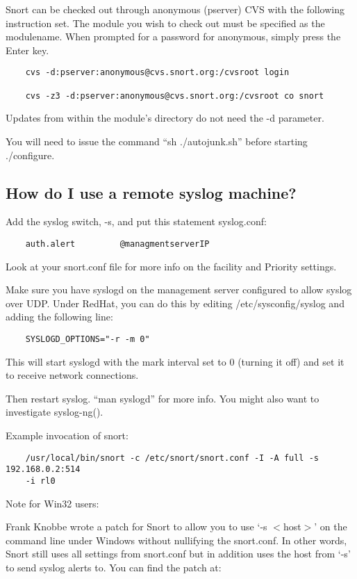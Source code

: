 \documentclass{article}
\begin{document}
Snort can be checked out through anonymous (pserver) CVS with the
following instruction set. The module you wish to check out must be
specified as the modulename. When prompted for a password for anonymous,
simply press the Enter key.
\begin{verbatim}
    cvs -d:pserver:anonymous@cvs.snort.org:/cvsroot login

    cvs -z3 -d:pserver:anonymous@cvs.snort.org:/cvsroot co snort
\end{verbatim}
Updates from within the module's directory do not need the -d parameter. 

You will need to issue the command ``sh ./autojunk.sh'' before starting
./configure.

\subsection{How do I use a remote syslog machine?}

Add the syslog switch, -s, and put this statement syslog.conf:
\begin{verbatim}
    auth.alert         @managmentserverIP
\end{verbatim}

Look at your snort.conf file for more info on the facility and Priority
settings.

Make sure you have syslogd on the management server configured to allow syslog over
UDP. Under RedHat, you can do this by editing /etc/sysconfig/syslog and adding
the following line:
\begin{verbatim}
    SYSLOGD_OPTIONS="-r -m 0"
\end{verbatim}
This will start syslogd with the mark interval set to 0 (turning it off) and
set it to receive network connections.

Then restart syslog. ``man syslogd'' for more info. You might also want to
investigate syslog-ng\linebreak ().

Example invocation of snort:
\begin{verbatim}
    /usr/local/bin/snort -c /etc/snort/snort.conf -I -A full -s 192.168.0.2:514
    -i rl0
\end{verbatim}
Note for Win32 users:

Frank Knobbe wrote a patch for Snort to allow you to use `-s $<$host$>$' on the
command line under Windows without nullifying the snort.conf. In other words,
Snort still uses all settings from snort.conf but in addition uses the host
from `-s' to send syslog alerts to. You can find the patch at:
\end{document}
